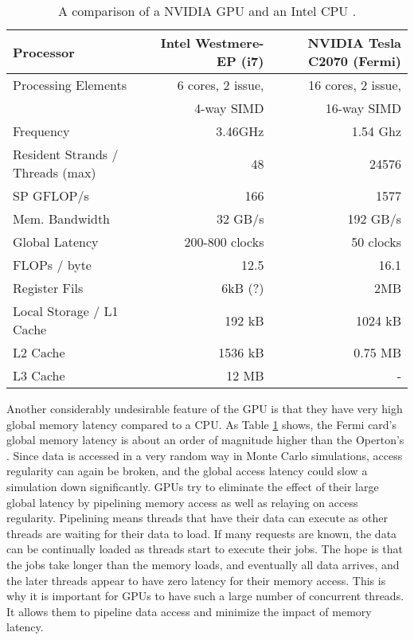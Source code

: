 \begin{table}[h]
\centering
\caption{A comparison of a NVIDIA GPU and an Intel CPU \cite{cent, cpu_latency}.}
\label{gpu_cpu_comp}
\begin{tabular}{| l | r | r |}
\hline
Processor & Intel Westmere-EP (i7) & NVIDIA Tesla C2070 (Fermi) \\
\hline
\hline
Processing Elements & 6 cores, 2 issue, & 16 cores, 2 issue, \\
& 4-way SIMD &  16-way SIMD  \\
\hline
Frequency & 3.46GHz &  1.54 Ghz \\
\hline
Resident Strands / Threads (max) & 48 & 24576 \\
\hline
SP GFLOP/s & 166 & 1577 \\
\hline
Mem. Bandwidth &  32 GB/s & 192 GB/s \\
\hline
Global Latency & 200-800 clocks & ~50 clocks \\
\hline
FLOPs / byte & 12.5  & 16.1 \\
\hline
Register Fils & 6kB (?) & 2MB \\
\hline
Local Storage / L1 Cache & 192 kB & 1024 kB \\
\hline
L2 Cache & 1536 kB & 0.75 MB \\
\hline
L3 Cache & 12 MB & - \\
\hline
\end{tabular}
\end{table}

Another considerably undesirable feature of the GPU is that they have very high global memory latency compared to a CPU.  As Table \ref{gpu_cpu_comp} shows, the Fermi card's global memory latency is about an order of magnitude higher than the Operton's \cite{cpu_latency,cuda}.  Since data is accessed in a very random way in Monte Carlo simulations, access regularity can again be broken, and the global access latency could slow a simulation down significantly.  GPUs try to eliminate the effect of their large global latency by pipelining memory access as well as relaying on access regularity.  Pipelining means threads that have their data can execute as other threads are waiting for their data to load.  If many requests are known, the data can be continually loaded as threads start to execute their jobs.  The hope is that the jobs take longer than the memory loads, and eventually all data arrives, and the later threads appear to have zero latency for their memory access.  This is why it is important for GPUs to have such a large number of concurrent threads.  It allows them to pipeline data access and minimize the impact of memory latency.

